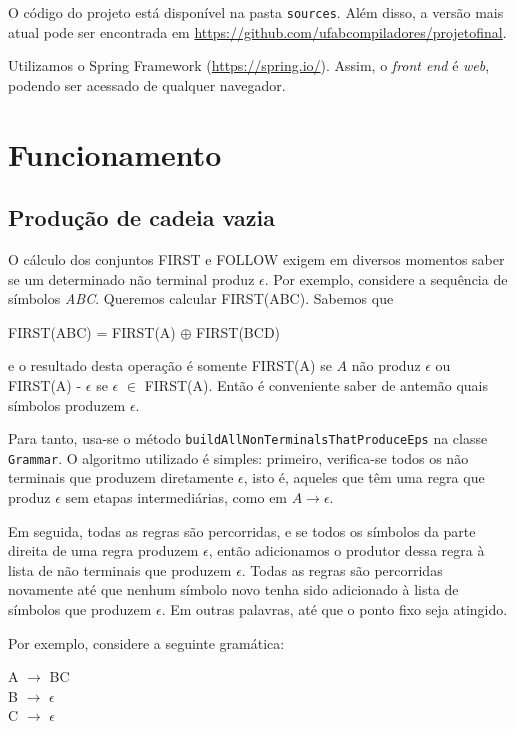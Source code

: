 \documentclass[11pt]{article}
\begin{document}
O código do projeto está disponível na pasta \texttt{sources}. Além disso, a versão
mais atual pode ser encontrada em \url{https://github.com/ufabcompiladores/projetofinal}.

Utilizamos o Spring Framework (\url{https://spring.io/}). Assim, o \emph{front end} é
\emph{web}, podendo ser acessado de qualquer navegador.

\section{Funcionamento}
\label{sec:orgheadline14}
\subsection{Produção de cadeia vazia}
\label{sec:orgheadline6}
O cálculo dos conjuntos FIRST e FOLLOW exigem em diversos momentos saber se
um determinado não terminal produz \(\epsilon\). Por exemplo, considere a sequência
de símbolos \emph{ABC}. Queremos calcular FIRST(ABC). Sabemos que

\begin{center}
FIRST(ABC) = FIRST(A) \(\oplus\) FIRST(BCD)
\end{center}

e o resultado desta operação é somente FIRST(A) se \(A\) não produz \(\epsilon\) ou
FIRST(A) - \(\epsilon\) se \(\epsilon\) \(\in\) FIRST(A). Então é conveniente saber de
antemão quais símbolos produzem \(\epsilon\).

Para tanto, usa-se o método \texttt{buildAllNonTerminalsThatProduceEps} na classe
\texttt{Grammar}. O algoritmo utilizado é simples: primeiro, verifica-se todos os não
terminais que produzem diretamente \(\epsilon\), isto é, aqueles que têm uma regra
que produz \(\epsilon\) sem etapas intermediárias, como em \(A \rightarrow \epsilon\).

Em seguida, todas as regras são percorridas, e se todos os símbolos da parte
direita de uma regra produzem \(\epsilon\), então adicionamos o produtor dessa regra
à lista de não terminais que produzem \(\epsilon\). Todas as regras são percorridas
novamente até que nenhum símbolo novo tenha sido adicionado à lista de símbolos
que produzem \(\epsilon\). Em outras palavras, até que o ponto fixo seja atingido.

Por exemplo, considere a seguinte gramática:

\begin{center}
A \(\rightarrow\) BC \\
B \(\rightarrow\) \(\epsilon\) \\
C \(\rightarrow\) \(\epsilon\)
\end{center}
\end{document}
